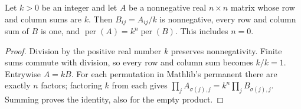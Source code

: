 \begin{lemma}
Let $k>0$ be an integer and let $A$ be a nonnegative real $n\times n$ matrix
whose row and column sums are $k$. Then $B_{ij}=A_{ij}/k$ is nonnegative,
every row and column sum of $B$ is one, and
$\operatorname{per}(A)=k^n\operatorname{per}(B)$. This includes $n=0$.
\end{lemma}
\begin{proof}
Division by the positive real number $k$ preserves nonnegativity.
Finite sums commute with division, so every row and column sum becomes
$k/k=1$. Entrywise $A=kB$. For each permutation in Mathlib's permanent
there are exactly $n$ factors; factoring $k$ from each gives
$\prod_j A_{\sigma(j),j}=k^n\prod_jB_{\sigma(j),j}$.
Summing proves the identity, also for the empty product.
\end{proof}
